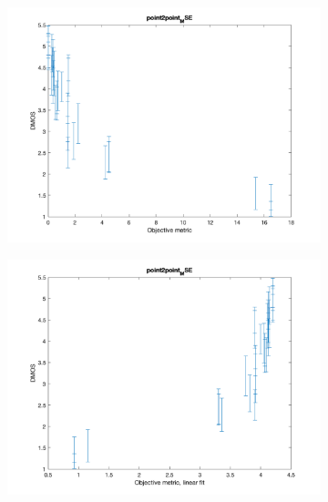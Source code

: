 \documentclass{article}
\begin{document}
\begin{figure}
    
    \centering
   \begin{subfigure}[b]{0.65\textwidth}
   \includegraphics[width=\textwidth]{Figures/task3/p2p_mse.png}
   \end{subfigure}
   
   \begin{subfigure}[b]{0.65\textwidth}
   \includegraphics[width=\textwidth]{Figures/task3/p2p_mse_linear.png}
   \end{subfigure}
   

\end{figure}
\end{document}
